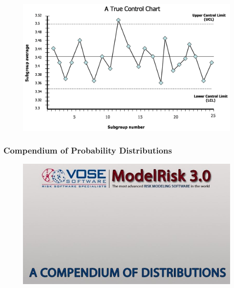 \documentclass[MAIN.tex]{subfiles}
\begin{document}
\begin{frame}
	\begin{figure}
\centering
\includegraphics[width=1.1\linewidth]{images/controlchart}
\end{figure}

\end{frame}
\begin{frame}
\frametitle{Compendium of Probability Distributions}
\begin{figure}
\centering
\includegraphics[width=1.05\linewidth]{images/vosecompendium}
\end{figure}
\end{frame}
\end{document}
